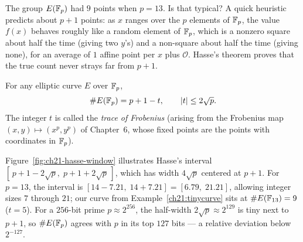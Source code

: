 The group $E(\mathbb{F}_p)$ had $9$ points when $p=13$. Is that typical? A quick heuristic predicts
about $p + 1$ points: as $x$ ranges over the $p$ elements of $\mathbb{F}_p$, the value $f(x)$
behaves roughly like a random element of $\mathbb{F}_p$, which is a nonzero square about half the
time (giving two $y$'s) and a non-square about half the time (giving none), for an average
of $1$ affine point per $x$ plus $\mathcal{O}$. Hasse's theorem proves that the true count
never strays far from $p + 1$.

\begin{theorem}[Hasse, 1933]
\label{ch21:hasse-thm}
For any elliptic curve $E$ over $\mathbb{F}_p$,
\[
\#E(\mathbb{F}_p) = p + 1 - t, \qquad \lvert t\rvert \le 2\sqrt{p}.
\]
The integer $t$ is called the \emph{trace of Frobenius} (arising from the Frobenius map
$(x,y) \mapsto (x^p, y^p)$ of Chapter~6, whose fixed points are the points with
coordinates in $\mathbb{F}_p$).
\end{theorem}

Figure~\ref{fig:ch21-hasse-window} illustrates Hasse's interval
$[\,p+1-2\sqrt p,\; p+1+2\sqrt p\,]$, which has width $4\sqrt p$ centered at $p+1$. For
$p=13$, the interval is $[14 - 7.21,\; 14 + 7.21] = [6.79,\; 21.21]$, allowing integer
sizes $7$ through $21$; our curve from Example~\ref{ch21:tinycurve} sits at $\#E(\mathbb{F}_{13})
= 9$ ($t = 5$). For a $256$-bit prime $p \approx 2^{256}$, the half-width $2\sqrt{p}
\approx 2^{129}$ is tiny next to $p+1$, so $\#E(\mathbb{F}_p)$ agrees with $p$ in its top $127$
bits --- a relative deviation below $2^{-127}$.

